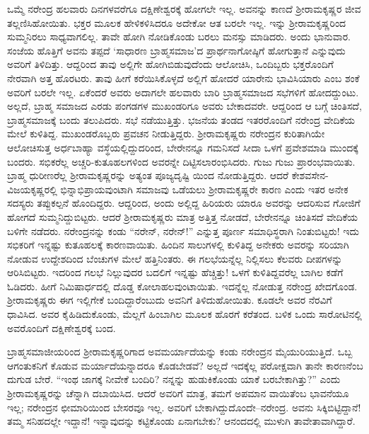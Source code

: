 ಒಮ್ಮೆ ನರೇಂದ್ರ ಹಲವಾರು ದಿನಗಳವರೆಗೂ ದಕ್ಷಿಣೇಶ್ವರಕ್ಕೆ ಹೋಗಲೇ ಇಲ್ಲ. ಅವನನ್ನು ಕಾಣದೆ ಶ್ರೀರಾಮಕೃಷ್ಣರ ಜೀವ ತಲ್ಲಣಿಸಿಹೋಯಿತು. ಭಕ್ತರ ಮೂಲಕ ಹೇಳಿಕಳಿಸಿದರೂ ಅದೇಕೋ ಆತ ಬರಲೇ ಇಲ್ಲ. ಇನ್ನು ಶ್ರೀರಾಮಕೃಷ್ಣರಿಂದ ಸುಮ್ಮನಿರಲು ಸಾಧ್ಯವಾಗಲಿಲ್ಲ. ತಾವೇ ಹೋಗಿ ನೋಡಿಕೊಂಡು ಬರಲು ಮನಸ್ಸು ಮಾಡಿದರು. ಅಂದು ಭಾನುವಾರ. ಸಂಜೆಯ ಹೊತ್ತಿಗೆ ಅವನು ತಪ್ಪದೆ ‘ಸಾಧಾರಣ ಬ್ರಾಹ್ಮಸಮಾಜ’ದ ಪ್ರಾರ್ಥನಾಗೋಷ್ಠಿಗೆ ಹೋಗುತ್ತಾನೆ ಎನ್ನುವುದು ಅವರಿಗೆ ತಿಳಿದಿತ್ತು. ಆದ್ದರಿಂದ ತಾವು ಅಲ್ಲಿಗೇ ಹೋಗಿಬಿಡುವುದೆಂದು ಆಲೋಚಿಸಿ, ಒಂದಿಬ್ಬರು ಭಕ್ತರೊಂದಿಗೆ ನೇರವಾಗಿ ಅತ್ತ ಹೊರಟರು. ತಾವು ಹೀಗೆ ಕರೆಯಿಸಿಕೊಳ್ಳದೆ ಅಲ್ಲಿಗೆ ಹೋದರೆ ಯಾರೇನು ಭಾವಿಸಿಯಾರು ಎಂಬ ಶಂಕೆ ಅವರಿಗೆ ಬರಲೇ ಇಲ್ಲ. ಏಕೆಂದರೆ ಅವರು ಅದಾಗಲೇ ಹಲವಾರು ಬಾರಿ ಬ್ರಾಹ್ಮಸಮಾಜದ ಸಭೆಗಳಿಗೆ ಹೋದದ್ದುಂಟು. ಅಲ್ಲದೆ, ಬ್ರಾಹ್ಮ ಸಮಾಜದ ಎರಡು ಪಂಗಡಗಳ ಮುಖಂಡರಿಗೂ ಅವರು ಬೇಕಾದವರೇ. ಆದ್ದರಿಂದ ಆ ಬಗ್ಗೆ ಚಿಂತಿಸದೆ, ಬ್ರಾಹ್ಮಸಮಾಜಕ್ಕೆ ಬಂದು ತಲುಪಿದರು. ಸಭೆ ನಡೆಯುತ್ತಿತ್ತು. ಭಜನೆಯ ತಂಡದ ಇತರರೊಂದಿಗೆ ನರೇಂದ್ರ ವೇದಿಕೆಯ ಮೇಲೆ ಕುಳಿತಿದ್ದ. ಮುಖಂಡರೊಬ್ಬರು ಪ್ರವಚನ ನೀಡುತ್ತಿದ್ದರು. ಶ್ರೀರಾಮಕೃಷ್ಣರು ನರೇಂದ್ರನ ಕುರಿತಾಗಿಯೇ ಆಲೋಚಿಸುತ್ತ ಅರ್ಧಬಾಹ್ಯಾ ವಸ್ಥೆಯಲ್ಲಿದ್ದುದರಿಂದ, ಬೇರೇನನ್ನೂ ಗಮನಿಸದೆ ಸೀದಾ ಒಳಗೆ ಪ್ರವೇಶಮಾಡಿ ಮುಂದಕ್ಕೆ ಬಂದರು. ಸಭಿಕರೆಲ್ಲ ಅಚ್ಚರಿ-ಕುತೂಹಲಗಳಿಂದ ಅವರನ್ನೇ ದಿಟ್ಟಿಸಲಾರಂಭಿಸಿದರು. ಗುಜು ಗುಜು ಪ್ರಾರಂಭವಾಯಿತು. ಬ್ರಾಹ್ಮ ಧುರೀಣರೆಲ್ಲ ಶ್ರೀರಾಮಕೃಷ್ಣರನ್ನು ಅತ್ಯಂತ ಪೂಜ್ಯದೃಷ್ಟಿ ಯಿಂದ ನೋಡುತ್ತಿದ್ದರು. ಆದರೆ ಕೇಶವಸೇನ-ವಿಜಯಕೃಷ್ಣರಲ್ಲಿ ಭಿನ್ನಾಭಿಪ್ರಾಯವುಂಟಾಗಿ ಸಮಾಜವು ಒಡೆಯಲು ಶ್ರೀರಾಮಕೃಷ್ಣರೇ ಕಾರಣ ಎಂದು ಇತರ ಅನೇಕ ಸದಸ್ಯರು ತಪ್ಪುಕಲ್ಪನೆ ಹೊಂದಿದ್ದರು. ಆದ್ದರಿಂದ, ಅಂದು ಅಲ್ಲಿದ್ದ ಹಿರಿಯರು ಯಾರೂ ಅವರನ್ನು ಆದರಿಸುವ ಗೋಜಿಗೆ ಹೋಗದೆ ಸುಮ್ಮನಿದ್ದುಬಿಟ್ಟರು. ಆದರೆ ಶ್ರೀರಾಮಕೃಷ್ಣರು ಮಾತ್ರ ಅತ್ತಿತ್ತ ನೋಡದೆ, ಬೇರೇನನ್ನೂ ಚಿಂತಿಸದೆ ವೇದಿಕೆಯ ಬಳಿಗೇ ನಡೆದರು. ನರೇಂದ್ರನನ್ನು ಕಂಡು “ನರೇನ್, ನರೇನ್!” ಎನ್ನುತ್ತ ಪೂರ್ಣ ಸಮಾಧಿಸ್ಥರಾಗಿ ನಿಂತುಬಿಟ್ಟರು! ಇದು ಸಭಿಕರಿಗೆ ಇನ್ನಷ್ಟು ಕುತೂಹಲಕ್ಕೆ ಕಾರಣವಾಯಿತು. ಹಿಂದಿನ ಸಾಲುಗಳಲ್ಲಿ ಕುಳಿತಿದ್ದ ಅನೇಕರು ಅವರನ್ನು ಸರಿಯಾಗಿ ನೋಡುವ ಉದ್ದೇಶದಿಂದ ಬೆಂಚುಗಳ ಮೇಲೆ ಹತ್ತಿನಿಂತರು. ಈ ಗಲಭೆಯನ್ನೆಲ್ಲ ನಿಲ್ಲಿಸಲು ಕೆಲವರು ದೀಪಗಳನ್ನು ಆರಿಸಿಬಿಟ್ಟರು. ಇದರಿಂದ ಗಲಭೆ ನಿಲ್ಲುವುದರ ಬದಲಿಗೆ ಇನ್ನಷ್ಟು ಹೆಚ್ಚಿತ್ತು! ಒಳಗೆ ಕುಳಿತಿದ್ದವರೆಲ್ಲ ಬಾಗಿಲ ಕಡೆಗೆ ಓಡಿದರು. ಹೀಗೆ ನಿಮಿಷಾರ್ಧದಲ್ಲಿ ದೊಡ್ಡ ಕೋಲಾಹಲವುಂಟಾಯಿತು. ಇದನ್ನೆಲ್ಲ ನೋಡುತ್ತ ನರೇಂದ್ರ ಖೇದಗೊಂಡ. ಶ್ರೀರಾಮಕೃಷ್ಣರು ಈಗ ಇಲ್ಲಿಗೇಕೆ ಬಂದಿದ್ದಾರೆಂಬುದು ಅವನಿಗೆ ತಿಳಿದುಹೋಯಿತು. ಕೂಡಲೇ ಅವರ ನೆರವಿಗೆ ಧಾವಿಸಿದ. ಅವರ ಕೈಹಿಡಿದುಕೊಂಡು, ಮೆಲ್ಲಗೆ ಹಿಂಬಾಗಿಲ ಮೂಲಕ ಹೊರಗೆ ಕರೆತಂದ. ಬಳಿಕ ಒಂದು ಸಾರೋಟಿನಲ್ಲಿ ಅವರೊಂದಿಗೆ ದಕ್ಷಿಣೇಶ್ವರಕ್ಕೆ ಬಂದ.

ಬ್ರಾಹ್ಮಸಮಾಜೀಯರಿಂದ ಶ್ರೀರಾಮಕೃಷ್ಣರಿಗಾದ ಅವಮರ್ಯಾದೆಯನ್ನು ಕಂಡು ನರೇಂದ್ರನ ಮೈಯುರಿಯುತ್ತಿದೆ. ಒಬ್ಬ ಆಗಂತುಕನಿಗೆ ಕೊಡುವ ಮರ್ಯಾದೆಯನ್ನಾದರೂ ಕೊಡಬೇಡವೆ? ಅಲ್ಲದೆ ಇದಕ್ಕೆಲ್ಲ ಪರೋಕ್ಷವಾಗಿ ತಾನೇ ಕಾರಣನೆಂಬ ದುಗುಡ ಬೇರೆ. “ಇಂಥ ಜಾಗಕ್ಕೆ ನೀವೇಕೆ ಬಂದಿರಿ? ನನ್ನನ್ನು ಹುಡುಕಿಕೊಂಡು ಯಾಕೆ ಬರಬೇಕಾಗಿತ್ತು?” ಎಂದು ಶ್ರೀರಾಮಕೃಷ್ಣರನ್ನು ಚೆನ್ನಾಗಿ ದಬಾಯಿಸಿದ. ಆದರೆ ಅವರಿಗೆ ಮಾತ್ರ, ತಮಗೆ ಅಪಮಾನ ವಾಯಿತೆಂಬ ಭಾವನೆಯೂ ಇಲ್ಲ; ನರೇಂದ್ರನ ಛೀಮಾರಿಯಿಂದ ಬೇಸರವೂ ಇಲ್ಲ. ಅವರಿಗೆ ಬೇಕಾಗಿದ್ದುದೊಂದೇ–ನರೇಂದ್ರ. ಅವನು ಸಿಕ್ಕಿಬಿಟ್ಟಿದ್ದಾನೆ! ತಮ್ಮ ಸನಿಹದಲ್ಲೇ ಇದ್ದಾನೆ! ಇನ್ನಾವುದನ್ನು ಕಟ್ಟಿಕೊಂಡು ಏನಾಗಬೇಕು? ಆನಂದದಲ್ಲಿ ಮುಳುಗಿ ತಾವೇತಾವಾಗಿದ್ದಾರೆ.

